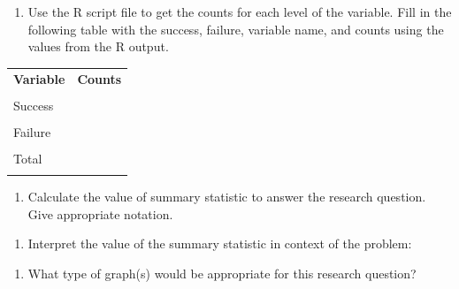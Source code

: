\documentclass[
]{report}
\providecommand{\tightlist}{%
  \setlength{\itemsep}{0pt}\setlength{\parskip}{0pt}}
\begin{document}
\begin{enumerate}
\def\labelenumi{\alph{enumi}.}
\setcounter{enumi}{2}
\tightlist
\item
  Use the R script file to get the counts for each level of the variable. Fill in the following table with the success, failure, variable name, and counts using the values from the R output.
\end{enumerate}

\begingroup
\begin{center}
\setlength{\tabcolsep}{14pt} 
\renewcommand{\arraystretch}{2} 
\begin{tabular}{|p{2in}|p{2in}|}
\hline
 {\textbf{Variable}} & {\textbf{Counts}} \\ 
 & \\ \hline
 Success & \\ 
 &  \\ \hline
 Failure & \\ 
 &  \\ \hline
 Total &  \\ 
 & \\ \hline  
\end{tabular}
\end{center}
\endgroup

\begin{enumerate}
\def\labelenumi{\alph{enumi}.}
\setcounter{enumi}{3}
\tightlist
\item
  Calculate the value of summary statistic to answer the research question. Give appropriate notation.
\end{enumerate}

\vspace{0.3in}

\begin{enumerate}
\def\labelenumi{\alph{enumi}.}
\setcounter{enumi}{4}
\tightlist
\item
  Interpret the value of the summary statistic in context of the problem:
\end{enumerate}

\vspace{0.3in}

\begin{enumerate}
\def\labelenumi{\alph{enumi}.}
\setcounter{enumi}{5}
\tightlist
\item
  What type of graph(s) would be appropriate for this research question?
\end{enumerate}

\vspace{0.1in}
\end{document}
